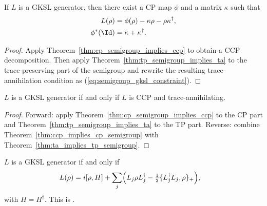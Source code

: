 \begin{theorem}
    \label{thm:generatorDecomp_of_gksl}
    \leanok
    If $L$ is a GKSL generator, then there exist a CP map $\phi$ and a matrix
    $\kappa$ such that
    \begin{align}
        L(\rho)
        &= \phi(\rho)-\kappa\rho-\rho\kappa^\dagger,
        \label{eq:semigroup_gksl_decomp}\\
        \phi^*(\Id)
        &= \kappa+\kappa^\dagger.
        \label{eq:semigroup_gksl_constraint}
    \end{align}
\end{theorem}

\begin{proof}\leanok
    Apply Theorem~\ref{thm:cp_semigroup_implies_ccp} to obtain a CCP
    decomposition. Then apply Theorem~\ref{thm:tp_semigroup_implies_ta} to the
    trace-preserving part of the semigroup and rewrite the resulting
    trace-annihilation condition as (\ref{eq:semigroup_gksl_constraint}).
\end{proof}

\begin{theorem}
    \label{thm:gksl_iff_ccp_ta}
    \leanok
    $L$ is a GKSL generator if and only if $L$ is CCP and
    trace-annihilating.
\end{theorem}

\begin{proof}\leanok
    Forward: apply Theorem~\ref{thm:cp_semigroup_implies_ccp} to the CP part and
    Theorem~\ref{thm:tp_semigroup_implies_ta} to the TP part.
    Reverse: combine Theorem~\ref{thm:ccp_implies_cp_semigroup} with
    Theorem~\ref{thm:ta_implies_tp_semigroup}.
\end{proof}

\begin{theorem}
    \label{thm:gksl_iff_lindblad}
    \leanok
    $L$ is a GKSL generator if and only if
    \begin{align}
        L(\rho)
        &= i[\rho,H]
        + \sum_j \Bigl(        L_j\rho L_j^\dagger
            - \tfrac{1}{2}\{L_j^\dagger L_j,\rho\}_+
        \Bigr),
        \label{eq:semigroup_gksl_lindblad}
    \end{align}
    with $H=H^\dagger$.
    This is \cite[Theorem~7.1]{Wolf2012Quantum}.
\end{theorem}

